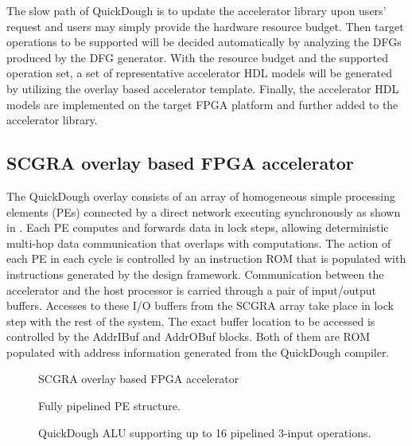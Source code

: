 The slow path of QuickDough is to update the accelerator library upon users' request and users may simply provide the hardware resource budget. Then target operations to be supported will be decided automatically by analyzing the DFGs produced by the DFG generator. With the resource budget and the supported operation set, a set of representative accelerator HDL models will be generated by utilizing the overlay based accelerator template. Finally, the accelerator HDL models are implemented on the target FPGA platform and further added to the accelerator library.

\subsection{SCGRA overlay based FPGA accelerator}
The QuickDough overlay consists of an array of homogeneous simple processing elements (PEs) connected by a direct network executing synchronously as shown in . Each PE computes and forwards data in lock steps, allowing deterministic multi-hop data communication that overlaps with computations. The action of each PE in each cycle is controlled by an instruction ROM that is populated with instructions generated by the design framework. Communication between the accelerator and the host processor is carried through a pair of input/output buffers. Accesses to these I/O buffers from the SCGRA array take place in lock step with the rest of the system. The exact buffer location to be accessed is controlled by the AddrIBuf and AddrOBuf blocks. Both of them are ROM populated with address information generated from the QuickDough compiler.

\begin{figure}[tb]
\vspace{-1em}
    \caption{SCGRA overlay based FPGA accelerator}
    \label{fig:scgra-accelerator}
\end{figure}

\begin{figure}[tb]
\center{\texttt{[image: pe]}}
\caption{Fully pipelined PE structure.}
\label{fig:pe}
\end{figure}

\begin{figure}[tb]
\caption{QuickDough ALU supporting up to 16 pipelined 3-input operations.}
\label{fig:ALU}
\vspace{-1em}
\end{figure} 

